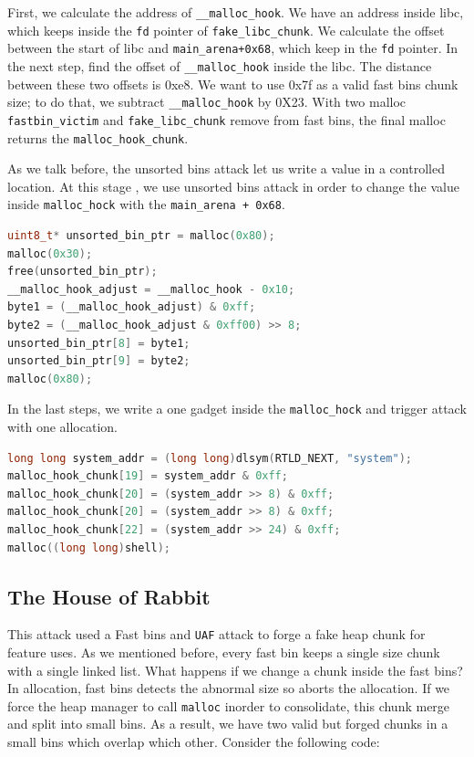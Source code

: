 \documentclass{masterthesis}
\newcommand*\fb{fast bins}
\newcommand*\ub{unsorted bins}
\newcommand*\sbs{small bins}
\newcommand*\Fb{Fast bins\xspace}
\newcommand*\mallocc{\lstinline{malloc}\xspace}
\begin{document}
First, we calculate the address of \lstinline{__malloc_hook}. We have an address inside libc, which keeps inside the \lstinline{fd} pointer of \lstinline{fake_libc_chunk}. We calculate the offset between the start of libc and \lstinline{main_arena+0x68}, which keep in the \lstinline{fd} pointer. In the next step, find the offset of \lstinline{__malloc_hook} inside the libc. The distance between these two offsets is 0xe8.
We want to use  0x7f as a valid \fb{} chunk size; to do that, we subtract \lstinline{__malloc_hook} by 0X23. With two malloc \lstinline{fastbin_victim} and \lstinline{fake_libc_chunk} remove from \fb{}, the final malloc returns the \lstinline{malloc_hook_chunk}.

As we talk before, the \ub{} attack let us write a value in a controlled location. At this stage , we use \ub{} attack in order to change the value inside \lstinline{malloc_hock} with the \lstinline{main_arena + 0x68}. 
\begin{lstlisting}[language=c,frame=tlrb]
uint8_t* unsorted_bin_ptr = malloc(0x80);
malloc(0x30);
free(unsorted_bin_ptr);
__malloc_hook_adjust = __malloc_hook - 0x10;
byte1 = (__malloc_hook_adjust) & 0xff; 
byte2 = (__malloc_hook_adjust & 0xff00) >> 8; 
unsorted_bin_ptr[8] = byte1;
unsorted_bin_ptr[9] = byte2;
malloc(0x80);
\end{lstlisting}
In the last steps, we write a one gadget inside the \lstinline{malloc_hock} and trigger attack with one allocation.
\begin{lstlisting}[language=c,frame=tlrb]
long long system_addr = (long long)dlsym(RTLD_NEXT, "system");
malloc_hook_chunk[19] = system_addr & 0xff;
malloc_hook_chunk[20] = (system_addr >> 8) & 0xff;
malloc_hook_chunk[20] = (system_addr >> 8) & 0xff;
malloc_hook_chunk[22] = (system_addr >> 24) & 0xff;
malloc((long long)shell);
\end{lstlisting}
\subsection{The House of Rabbit}

This attack used a \Fb{} and \lstinline{UAF} attack to forge a fake heap chunk for feature uses. As we mentioned before, every fast bin keeps a single size chunk with a single linked list. What happens if we change a chunk inside the \fb{}? In allocation, \fb{} detects the abnormal size so aborts the allocation. If we force the heap manager to call \mallocc{} inorder to consolidate, this chunk merge and split into \sbs{}. As a result, we have two valid but forged chunks in a \sbs{} which overlap which other. Consider the following code:
\end{document}
